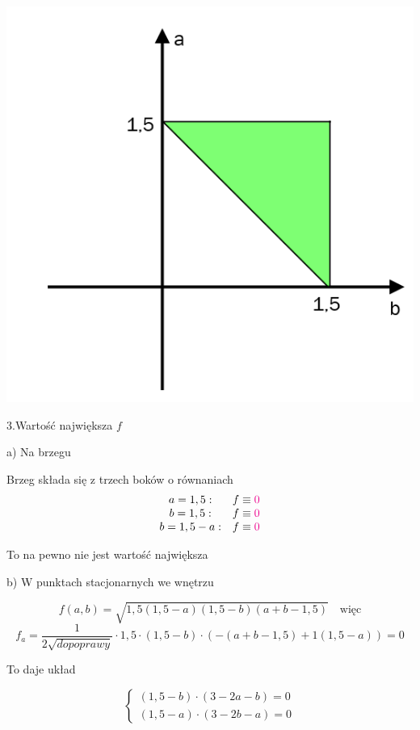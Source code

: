 \begin{center}
    \includegraphics[scale=0.5]{img/trojkat.png}
\end{center}
\bigskip

3.Wartość największa $f$ \bigskip

a) Na brzegu

Brzeg składa się z trzech boków o równaniach
\[ \begin{array}{cc}
    a = 1,5: & f \equiv \textcolor{magenta}{0} \\
    b = 1,5: & f \equiv \textcolor{magenta}{0} \\
    b = 1,5 - a: & f \equiv \textcolor{magenta}{0} \\
\end{array}
\]

To na pewno nie jest wartość największa \bigskip

b) W punktach stacjonarnych we wnętrzu

\[ f(a,b) = \sqrt{1,5(1,5-a)(1,5-b)(a+b-1,5)} \quad \textrm{więc} \]
\[ f_a = \frac{1}{2\sqrt{do poprawy}} \cdot 1,5 \cdot (1,5 - b) \cdot (-(a+b - 1,5) + 1(1,5 - a)) = 0 \]

To daje układ

\[ \begin{cases} (1,5 - b) \cdot (3 - 2a - b) = 0 \\ (1,5 - a) \cdot (3 - 2b - a) = 0 \end{cases} \]

